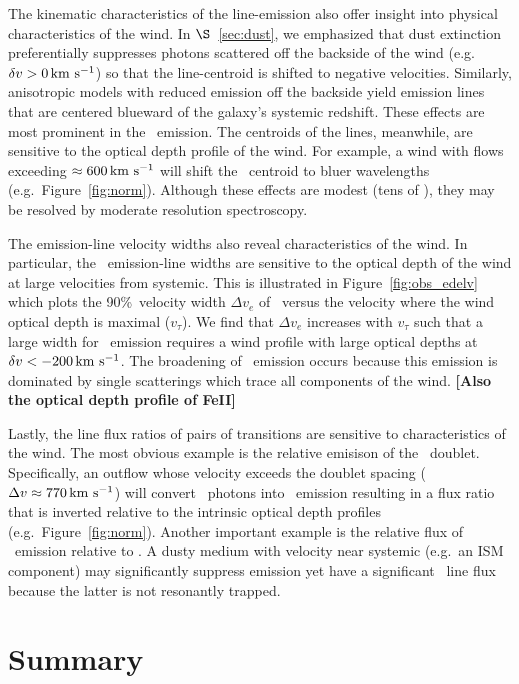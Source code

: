 \documentclass[12pt,preprint]{aastex}
\begin{document}
The kinematic characteristics of the line-emission also offer insight into physical
characteristics of the wind.
In $\S$~\ref{sec:dust}, we emphasized that dust extinction
preferentially suppresses photons scattered off the backside of the
wind (e.g.\ $\delta v > 0 \, {\rm km~s^{-1}}$) so that the line-centroid is shifted to
negative velocities.  Similarly, anisotropic models with reduced
emission off the backside yield emission lines that are centered
blueward of the galaxy's systemic redshift.  These effects are most
prominent in the \feiis\ emission.  The centroids of the 
lines, meanwhile, are sensitive to the optical depth
profile of the wind.   For example, a wind with flows exceeding
$\approx 600 \, {\rm km~s^{-1}}$ will shift the \mgiia\ centroid to bluer
wavelengths (e.g.\ Figure~\ref{fig:norm}).
Although these effects are modest (tens of
\kms), they may be resolved by moderate resolution spectroscopy.

The emission-line velocity widths also reveal
characteristics of the wind.  In particular, the \feiis\ emission-line 
widths are
sensitive to the optical depth of the wind at large velocities from
systemic.  This is illustrated in Figure~\ref{fig:obs_edelv} which plots
the 90\%\ velocity width $\Delta v_e$ of \feiic\ versus the velocity
where the wind optical depth is maximal ($v_\tau$).  We find that
$\Delta v_e$ increases with $v_\tau$ such that a large width for
\feiis\ emission requires a wind profile with large optical depths at
$\delta v < -200 \, {\rm km~s^{-1}}$.  The broadening of \feiis\ emission occurs
because this emission is dominated by single scatterings 
which trace all components of the wind.  {\bf [Also the optical depth profile of
  FeII]}  

Lastly, the line flux ratios of pairs of transitions 
are sensitive to characteristics of the wind.
The most obvious example is the relative emisison of the \mgiid\
doublet.  Specifically, an outflow whose velocity exceeds the doublet
spacing ($\Delta v \approx 770 \, {\rm km~s^{-1}}$) will convert \mgiia\ photons
into \mgiib\ emission resulting in a flux ratio that is inverted
relative to the intrinsic optical depth profiles (e.g.\
Figure~\ref{fig:norm}).  Another important example is the relative
flux of \feiis\ emission relative to .  
A dusty medium with velocity near systemic (e.g.\ an
ISM component) may significantly suppress \ion{Mg}{2} emission yet
have a significant \feiis\ line flux because the latter is not
resonantly trapped.  

\section{Summary}
\label{sec:summary}
\end{document}
